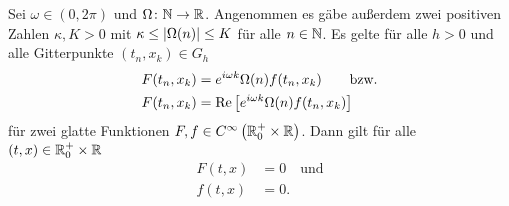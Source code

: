 \begin{satz}\label{satz:glgregulaer}
Sei $\omega \in (0, 2\pi)$ und $\Omega\colon \mathbb N \to \mathbb R$.
Angenommen es gäbe außerdem zwei positiven Zahlen $\kappa, K > 0$ mit $\kappa \leq \left| \Omega(n) \right| \leq K$ für alle $n \in \mathbb N$.
Es gelte für alle $h > 0$ und alle Gitterpunkte $(t_n, x_k) \in G_h$
\begin{align}\label{satz:glgreg:vor}
\begin{split}
F(t_n, x_k) &= e^{i \omega k} \Omega(n) f(t_n, x_k) \qquad \text{bzw.}\\
F(t_n, x_k) &= \operatorname{Re}\left[ e^{i \omega k} \Omega(n) f(t_n, x_k) \right]
\end{split}
\end{align}
für zwei glatte Funktionen $F,f \in C^{\infty}\left( \mathbb R^+_0 \times \mathbb R \right)$. Dann gilt für alle $(t,x) \in \mathbb R^+_0 \times \mathbb R$
\begin{align*}
F(t, x) &= 0 \quad \text{und}\\
f(t, x) &= 0.
\end{align*}
\end{satz}
